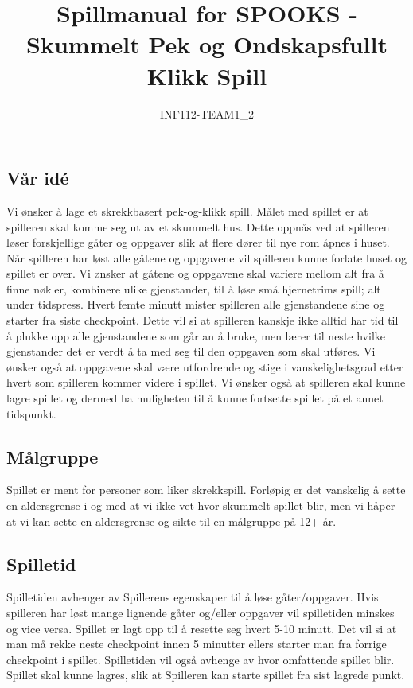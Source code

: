 \documentclass[a4paper]{article}
\title{Spillmanual for SPOOKS - Skummelt Pek og Ondskapsfullt Klikk Spill}
\author{INF112-TEAM1\_2}
\begin{document}
\maketitle

\tableofcontents
\pagebreak

\subsection{Vår idé} Vi ønsker å lage et skrekkbasert pek-og-klikk spill. Målet med spillet er at spilleren skal komme seg ut av et skummelt hus. Dette oppnås ved at spilleren løser forskjellige gåter og oppgaver slik at flere dører til nye rom åpnes i huset. Når spilleren har løst alle gåtene og oppgavene vil spilleren kunne forlate huset og spillet er over. Vi ønsker at gåtene og oppgavene skal variere mellom alt fra å finne nøkler, kombinere ulike gjenstander, til å løse små hjernetrims spill; alt under tidspress. Hvert femte minutt mister spilleren alle gjenstandene sine og starter fra siste checkpoint. Dette vil si at spilleren kanskje ikke alltid har tid til å plukke opp alle gjenstandene som går an å bruke, men lærer til neste hvilke gjenstander det er verdt å ta med seg til den oppgaven som skal utføres. Vi ønsker også at oppgavene skal være utfordrende og stige i vanskelighetsgrad etter hvert som spilleren kommer videre i spillet. Vi ønsker også at spilleren skal kunne lagre spillet og dermed ha muligheten til å kunne fortsette spillet på et annet tidspunkt.

\subsection{Målgruppe}
Spillet er ment for personer som liker skrekkspill. Forløpig er det vanskelig å sette en aldersgrense i og med at vi ikke vet hvor skummelt spillet blir, men vi håper at vi kan sette en aldersgrense og sikte til en målgruppe på 12+ år.

\subsection{Spilletid}Spilletiden avhenger av Spillerens egenskaper til å løse gåter/oppgaver. Hvis spilleren har løst mange lignende gåter og/eller oppgaver vil spilletiden minskes og vice versa. 
Spillet er lagt opp til å resette seg hvert 5-10 minutt. Det vil si at man må rekke neste checkpoint innen 
5 minutter ellers starter man fra forrige checkpoint i spillet. Spilletiden vil også avhenge av hvor omfattende spillet blir. Spillet skal kunne lagres, slik at Spilleren kan starte spillet fra sist lagrede punkt.
\end{document}
